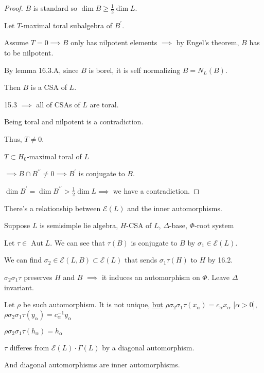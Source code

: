 \documentclass{article}
\theoremstyle{definition}
\begin{document}
\begin{proof}
        \(B\) is standard so \(\dim B \geq \frac{1}{2}\dim L\).

        Let \(T\)-maximal toral subalgebra of \(B^{\prime}\).

        Assume \(T=0 \implies B\) only has nilpotent elements \(\implies\) by Engel's theorem, \(B\) has to be nilpotent.

        By lemma 16.3.A, since \(B\) is borel, it is self normalizing \(B = N_L (B)\).

        Then \(B\) is a CSA of \(L\).

        15.3 \(\implies\) all of CSAs of \(L\) are toral.

        Being toral and nilpotent is a contradiction.

        Thus, \(T\neq 0\).

        \(T \subset H_0\)-maximal toral of \(L\)

        \(\implies B \cap B^{\prime\prime} \neq 0 \implies B^{\prime} \) is conjugate to \(B\).

        \(\dim B^{\prime} = \dim B^{\prime\prime} > \frac{1}{2} \dim L \implies\) we have a contradiction.
    \end{proof}

    There's a relationship between \(\mathscr{E}(L)\) and the inner automorphisms.

    Suppose \(L\) is semisimple lie algebra, \(H\)-CSA of \(L\), \(\Delta\)-base, \(\Phi\)-root system

    Let \(\tau \in \operatorname{Aut} L\). We can see that \(\tau (B)\) is conjugate to \(B\) by \(\sigma_1 \in \mathscr{E} (L)\).

    We can find \(\sigma_2 \in \mathscr{E} (L,B) \subset \mathscr{E} (L)\) that sends \(\sigma_1 \tau (H)\) to \(H\) by 16.2.
    
    \(\sigma_2 \sigma_1 \tau\) preserves \(H\) and \(B\) \(\implies\) it induces an automorphism on \(\Phi\). Leave \(\Delta\) invariant.

    Let \(\rho\) be such automorphism. It is not unique, \underline{but} \(\rho \sigma_2 \sigma_1 \tau (x_\alpha) = c_\alpha x_\alpha\) [\(\alpha > 0\)], \(\rho \sigma_2 \sigma_1 \tau (y_\alpha) = c_\alpha ^{-1} y_\alpha\)

    \(\rho \sigma_2 \sigma_1 \tau (h_\alpha) = h_\alpha\)

    \(\tau\) differes from \(\mathscr{E} (L) \cdot \Gamma(L)\) by a diagonal automorphism.
    
    And diagonal automorphisms are inner automorphisms.
\end{document}
